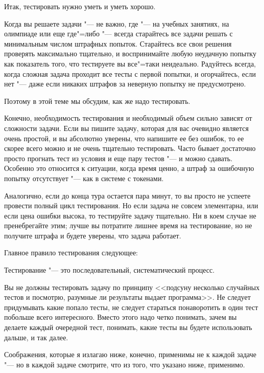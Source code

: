 \documentclass[a4paper,10pt]{problems}
\begin{document}
Итак, тестировать нужно уметь и уметь хорошо.

Когда вы решаете задачи "--- не важно, где "--- на учебных занятиях, на олимпиаде или еще где"=либо "--- всегда старайтесь все задачи решать с минимальным числом штрафных попыток. Старайтесь все свои решения проверять максимально тщательно, и воспринимайте любую неудачную попытку как показатель того, что тестируете вы все"=таки неидеально. Радуйтесь всегда, когда сложная задача проходит все тесты с первой попытки, и огорчайтесь, если нет "--- даже если никаких штрафов за неверную попытку не предусмотрено.

Поэтому в этой теме мы обсудим, как же надо тестировать.

Конечно, необходимость тестирования и необходимый объем сильно зависят от сложности задачи. 
Если вы пишите задачу, которая для вас очевидно является очень простой, и вы абсолютно уверены, что напишите ее без ошибок, 
то ее скорее всего можно и не очень тщательно тестировать. 
Часто бывает достаточно просто прогнать тест из условия и еще пару тестов "--- и можно сдавать. 
Особенно это относится к ситуации, когда время ценно, а штраф за ошибочную попытку отсутствует "--- как в системе с токенами.

Аналогично, если до конца тура остается пара минут, то вы просто не успеете провести полный цикл тестирования. 
Но если задача не совсем элементарна, или если цена ошибки высока, то тестируйте задачу тщательно. Ни в коем случае не пренебрегайте этим; 
лучше вы потратите лишнее время на тестирование, но не получите штрафа и будете уверены, что задача работает.

Главное правило тестирования следующее:

\begin{framed}
Тестирование "--- это последовательный, систематический процесс.
\end{framed}

Вы не должны тестировать задачу по принципу <<подсуну несколько случайных тестов и посмотрю, разумные ли результаты выдает программа>>. 
Не следует придумывать какие попало тесты, не следует стараться понаворотить в один тест побольше всего интересного. 
Вместо этого надо четко понимать, зачем вы делаете каждый очередной тест, понимать, какие тесты вы будете использовать дальше, и так далее.

Соображения, которые я излагаю ниже, конечно, применимы не к каждой задаче "--- но в каждой задаче смотрите, что из того, что указано ниже, применимо.
\end{document}
